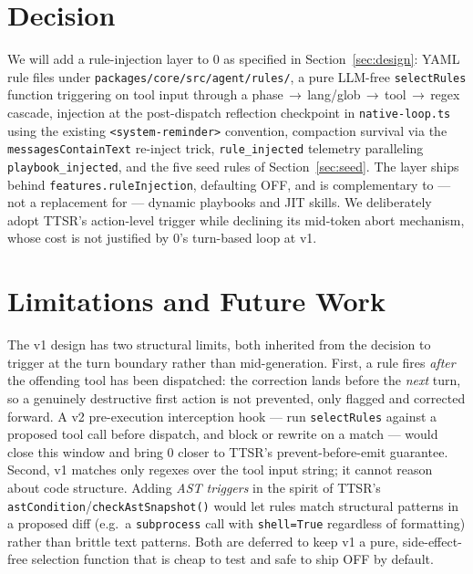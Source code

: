 \documentclass[11pt]{article}
\begin{document}
\section{Decision}
\label{sec:decision}

We will add a rule-injection layer to 0 as specified in
Section~\ref{sec:design}: YAML rule files under
\texttt{packages/core/src/agent/rules/}, a pure LLM-free \texttt{selectRules}
function triggering on tool input through a phase\,$\rightarrow$\,lang/glob\,$\rightarrow$\,tool\,$\rightarrow$\,regex
cascade, injection at the post-dispatch reflection checkpoint in
\texttt{native-loop.ts} using the existing \texttt{<system-reminder>} convention,
compaction survival via the \texttt{messagesContainText} re-inject trick,
\texttt{rule\_injected} telemetry paralleling \texttt{playbook\_injected}, and the
five seed rules of Section~\ref{sec:seed}. The layer ships behind
\texttt{features.ruleInjection}, defaulting OFF, and is complementary to --- not a
replacement for --- dynamic playbooks and JIT skills. We deliberately adopt
TTSR's action-level trigger while declining its mid-token abort mechanism, whose
cost is not justified by 0's turn-based loop at v1.

\section{Limitations and Future Work}
\label{sec:future}

The v1 design has two structural limits, both inherited from the decision to
trigger at the turn boundary rather than mid-generation. First, a rule fires
\emph{after} the offending tool has been dispatched: the correction lands before
the \emph{next} turn, so a genuinely destructive first action is not prevented,
only flagged and corrected forward. A v2 pre-execution interception hook --- run
\texttt{selectRules} against a proposed tool call before dispatch, and block or
rewrite on a match --- would close this window and bring 0 closer to TTSR's
prevent-before-emit guarantee. Second, v1 matches only regexes over the tool
input string; it cannot reason about code structure. Adding \emph{AST triggers}
in the spirit of TTSR's \texttt{astCondition}/\texttt{checkAstSnapshot()} would
let rules match structural patterns in a proposed diff (e.g.\ a
\texttt{subprocess} call with \texttt{shell=True} regardless of formatting)
rather than brittle text patterns. Both are deferred to keep v1 a pure,
side-effect-free selection function that is cheap to test and safe to ship OFF by
default.
\end{document}
